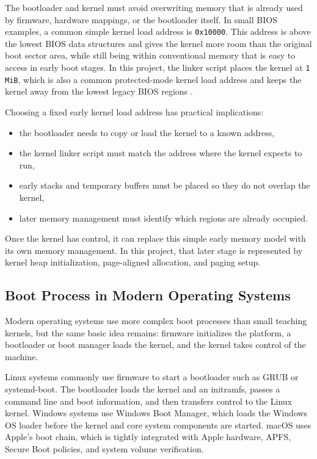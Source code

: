 The bootloader and kernel must avoid overwriting memory that is already used by firmware, hardware mappings, or the bootloader itself. In small BIOS examples, a common simple kernel load address is \texttt{0x10000}. This address is above the lowest BIOS data structures and gives the kernel more room than the original boot sector area, while still being within conventional memory that is easy to access in early boot stages. In this project, the linker script places the kernel at \texttt{1 MiB}, which is also a common protected-mode kernel load address and keeps the kernel away from the lowest legacy BIOS regions \cite{osdevMemoryMapX86}.

Choosing a fixed early kernel load address has practical implications:
\begin{itemize}
  \item the bootloader needs to copy or load the kernel to a known address,
  \item the kernel linker script must match the address where the kernel expects to run,
  \item early stacks and temporary buffers must be placed so they do not overlap the kernel,
  \item later memory management must identify which regions are already occupied.
\end{itemize}

Once the kernel has control, it can replace this simple early memory model with its own memory management. In this project, that later stage is represented by kernel heap initialization, page-aligned allocation, and paging setup.

\subsection{Boot Process in Modern Operating Systems}
Modern operating systems use more complex boot processes than small teaching kernels, but the same basic idea remains: firmware initializes the platform, a bootloader or boot manager loads the kernel, and the kernel takes control of the machine.

Linux systems commonly use firmware to start a bootloader such as GRUB or systemd-boot. The bootloader loads the kernel and an initramfs, passes a command line and boot information, and then transfers control to the Linux kernel. Windows systems use Windows Boot Manager, which loads the Windows OS loader before the kernel and core system components are started. macOS uses Apple's boot chain, which is tightly integrated with Apple hardware, APFS, Secure Boot policies, and system volume verification\cite{linuxX86BootProtocol,microsoftWindowsBootOptions,appleSiliconBootProcess,appleIntelBootProcess}.

